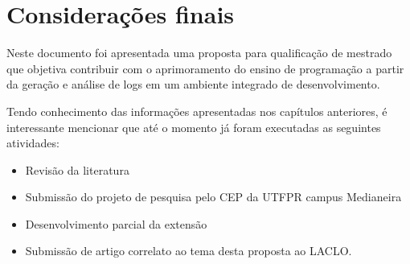 \section{Considerações finais}
\label{cap-consideracoes-finais}

Neste documento foi apresentada uma proposta para qualificação de mestrado que objetiva contribuir com o aprimoramento do ensino de programação a partir da geração e análise de logs em um ambiente integrado de desenvolvimento. 

Tendo conhecimento das informações apresentadas nos capítulos anteriores, é interessante mencionar que até o momento já foram executadas as seguintes atividades:

\begin{itemize}
\item Revisão da literatura
\item Submissão do projeto de pesquisa pelo CEP da UTFPR campus Medianeira
\item Desenvolvimento parcial da extensão
\item Submissão de artigo correlato ao tema desta proposta ao LACLO.
\end{itemize}

